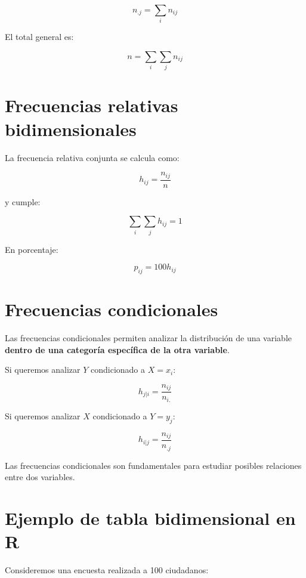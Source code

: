 \documentclass[
  spanish,
  14pt,
  letterpaper,
  DIV=11,
  numbers=noendperiod]{scrartcl}
\begin{document}
\[
n_{.j}=\sum_i n_{ij}
\]

El total general es:

\[
n=\sum_i\sum_j n_{ij}
\]

\section{Frecuencias relativas
bidimensionales}\label{frecuencias-relativas-bidimensionales}

La frecuencia relativa conjunta se calcula como:

\[
h_{ij}=\frac{n_{ij}}{n}
\]

y cumple:

\[
\sum_i\sum_jh_{ij}=1
\]

En porcentaje:

\[
p_{ij}=100h_{ij}
\]

\section{Frecuencias condicionales}\label{frecuencias-condicionales}

Las frecuencias condicionales permiten analizar la distribución de una
variable \textbf{dentro de una categoría específica de la otra
variable}.

Si queremos analizar \(Y\) condicionado a \(X=x_i\):

\[
h_{j|i}=
\frac{n_{ij}}{n_{i.}}
\]

Si queremos analizar \(X\) condicionado a \(Y=y_j\):

\[
h_{i|j}=
\frac{n_{ij}}{n_{.j}}
\]

Las frecuencias condicionales son fundamentales para estudiar posibles
relaciones entre dos variables.

\section{Ejemplo de tabla bidimensional en
R}\label{ejemplo-de-tabla-bidimensional-en-r}

Consideremos una encuesta realizada a 100 ciudadanos:
\end{document}
